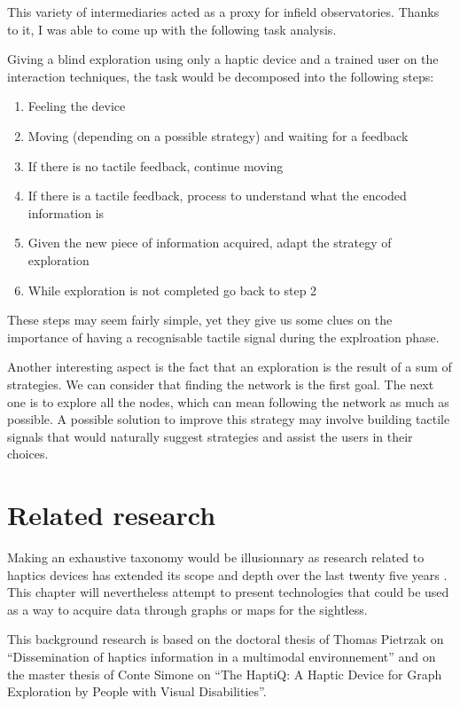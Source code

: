 This variety of intermediaries acted as a proxy for infield
observatories. Thanks to it, I was able to come up with the following
task analysis.

Giving a blind exploration using only a haptic device and a trained user
on the interaction techniques, the task would be decomposed into the
following steps:

\begin{enumerate}
\def\labelenumi{\arabic{enumi}.}
\item
  Feeling the device
\item
  Moving (depending on a possible strategy) and waiting for a feedback
\item
  If there is no tactile feedback, continue moving
\item
  If there is a tactile feedback, process to understand what the encoded
  information is
\item
  Given the new piece of information acquired, adapt the strategy of
  exploration
\item
  While exploration is not completed go back to step 2
\end{enumerate}

These steps may seem fairly simple, yet they give us some clues on the
importance of having a recognisable tactile signal during the
explroation phase.

Another interesting aspect is the fact that an exploration is the result
of a sum of strategies. We can consider that finding the network is the
first goal. The next one is to explore all the nodes, which can mean
following the network as much as possible. A possible solution to
improve this strategy may involve building tactile signals that would
naturally suggest strategies and assist the users in their choices.

\section{Related research}\label{related-research}

Making an exhaustive taxonomy would be illusionnary as research related
to haptics devices has extended its scope and depth over the last twenty
five years \cite{roberts2007we}. This chapter will nevertheless attempt to
present technologies that could be used as a way to acquire data through graphs or
maps for the sightless.

This background research is based on the doctoral thesis of
Thomas Pietrzak on ``Dissemination of haptics information in a
multimodal environnement'' \cite{pietrzak:tel-00390057} and on the master thesis of Conte Simone on
``The HaptiQ: A Haptic Device for Graph Exploration by People with Visual Disabilities''.


